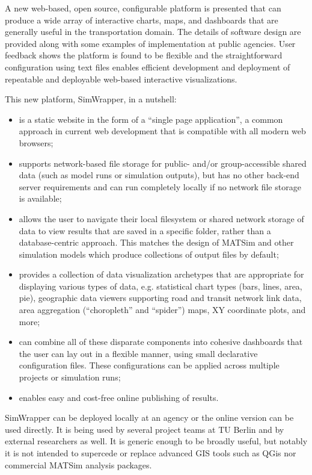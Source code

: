 \documentclass[3p,times,procedia]{elsarticle}
\begin{document}
A new web-based, open source, configurable platform is presented that can produce a wide array of interactive charts, maps, and dashboards that are generally useful in the transportation domain. The details of software design are provided along with some examples of implementation at public agencies. User feedback shows the platform is found to be flexible and the straightforward configuration using text files enables efficient development and deployment of repeatable and deployable web-based interactive visualizations.

This new platform, SimWrapper, in a nutshell:

\begin{itemize}[]
\item
    is a static website in the form of a ``single page application'', a common approach in current web development that is compatible with all modern web browsers;
\item
    supports network-based file storage for public- and/or group-accessible shared data (such as model runs or simulation outputs), but has no other back-end server requirements and can run completely locally if no network file storage is available;
\item
    allows the user to navigate their local filesystem or shared network storage of data to view results that are saved in a specific folder, rather than a database-centric approach. This matches the design of MATSim and other simulation models which produce collections of output files by default;
\item
    provides a collection of data visualization archetypes that are appropriate for displaying various types of data, e.g. statistical chart types (bars, lines, area, pie), geographic data viewers supporting road and transit network link data, area aggregation (``choropleth'' and ``spider'') maps, XY coordinate plots, and more;
\item
    can combine all of these disparate components into cohesive dashboards that the user can lay out in a flexible manner, using small declarative configuration files. These configurations can be applied across multiple projects or simulation runs;
\item
    enables easy and cost-free online publishing of results.
\end{itemize}

SimWrapper can be deployed locally at an agency or the online version can be used directly. It is being used by several project teams at TU Berlin and by external researchers as well. It is generic enough to be broadly useful, but notably it is not intended to supercede or replace advanced GIS tools such as QGis nor commercial MATSim analysis packages.
\end{document}
